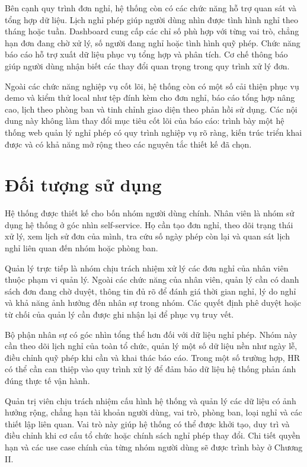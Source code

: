 Bên cạnh quy trình đơn nghỉ, hệ thống còn có các chức năng hỗ trợ quan sát và tổng hợp dữ liệu. Lịch nghỉ phép giúp người dùng nhìn được tình hình nghỉ theo tháng hoặc tuần. Dashboard cung cấp các chỉ số phù hợp với từng vai trò, chẳng hạn đơn đang chờ xử lý, số người đang nghỉ hoặc tình hình quỹ phép. Chức năng báo cáo hỗ trợ xuất dữ liệu phục vụ tổng hợp và phân tích. Cơ chế thông báo giúp người dùng nhận biết các thay đổi quan trọng trong quy trình xử lý đơn.

Ngoài các chức năng nghiệp vụ cốt lõi, hệ thống còn có một số cải thiện phục vụ demo và kiểm thử local như tệp đính kèm cho đơn nghỉ, báo cáo tổng hợp nâng cao, lịch theo phòng ban và tinh chỉnh giao diện theo phản hồi sử dụng. Các nội dung này không làm thay đổi mục tiêu cốt lõi của báo cáo: trình bày một hệ thống web quản lý nghỉ phép có quy trình nghiệp vụ rõ ràng, kiến trúc triển khai được và có khả năng mở rộng theo các nguyên tắc thiết kế đã chọn.

\section{Đối tượng sử dụng}
Hệ thống được thiết kế cho bốn nhóm người dùng chính. Nhân viên là nhóm sử dụng hệ thống ở góc nhìn self-service. Họ cần tạo đơn nghỉ, theo dõi trạng thái xử lý, xem lịch sử đơn của mình, tra cứu số ngày phép còn lại và quan sát lịch nghỉ liên quan đến nhóm hoặc phòng ban.

Quản lý trực tiếp là nhóm chịu trách nhiệm xử lý các đơn nghỉ của nhân viên thuộc phạm vi quản lý. Ngoài các chức năng của nhân viên, quản lý cần có danh sách đơn đang chờ duyệt, thông tin đủ rõ để đánh giá thời gian nghỉ, lý do nghỉ và khả năng ảnh hưởng đến nhân sự trong nhóm. Các quyết định phê duyệt hoặc từ chối của quản lý cần được ghi nhận lại để phục vụ truy vết.

Bộ phận nhân sự có góc nhìn tổng thể hơn đối với dữ liệu nghỉ phép. Nhóm này cần theo dõi lịch nghỉ của toàn tổ chức, quản lý một số dữ liệu nền như ngày lễ, điều chỉnh quỹ phép khi cần và khai thác báo cáo. Trong một số trường hợp, HR có thể cần can thiệp vào quy trình xử lý để đảm bảo dữ liệu hệ thống phản ánh đúng thực tế vận hành.

Quản trị viên chịu trách nhiệm cấu hình hệ thống và quản lý các dữ liệu có ảnh hưởng rộng, chẳng hạn tài khoản người dùng, vai trò, phòng ban, loại nghỉ và các thiết lập liên quan. Vai trò này giúp hệ thống có thể được khởi tạo, duy trì và điều chỉnh khi cơ cấu tổ chức hoặc chính sách nghỉ phép thay đổi. Chi tiết quyền hạn và các use case chính của từng nhóm người dùng sẽ được trình bày ở Chương II.


